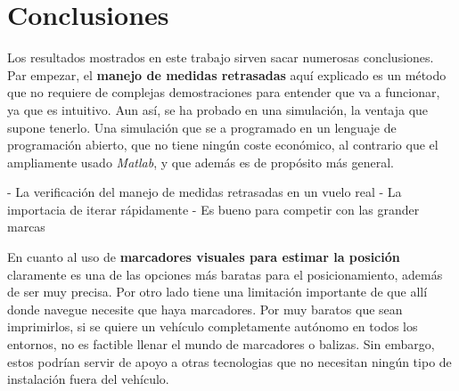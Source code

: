 \chapter{Conclusiones} \label{chp-conclusiones}




Los resultados mostrados en este trabajo sirven sacar numerosas conclusiones. Par empezar, el \textbf{manejo de medidas retrasadas} aquí explicado es un método que no requiere de complejas demostraciones para entender que va a funcionar, ya que es intuitivo. Aun así, se ha probado en una simulación, la ventaja que supone tenerlo. Una simulación que se a programado en un lenguaje de programación abierto, que no tiene ningún coste económico, al contrario que el ampliamente usado \textit{Matlab}, y que además es de propósito más general. 




- La verificación del manejo de medidas retrasadas en un vuelo real
- La importacia de iterar rápidamente
- Es bueno para competir con las grander marcas

En cuanto al uso de \textbf{marcadores visuales para estimar la posición} claramente es una de las opciones más baratas para el posicionamiento, además de ser muy precisa. Por otro lado tiene una limitación importante de que allí donde navegue necesite que haya marcadores. Por muy baratos que sean imprimirlos, si se quiere un vehículo completamente autónomo en todos los entornos, no es factible llenar el mundo de marcadores o balizas.  
Sin embargo, estos podrían servir de apoyo a otras tecnologias que no necesitan ningún tipo de instalación fuera del vehículo.

